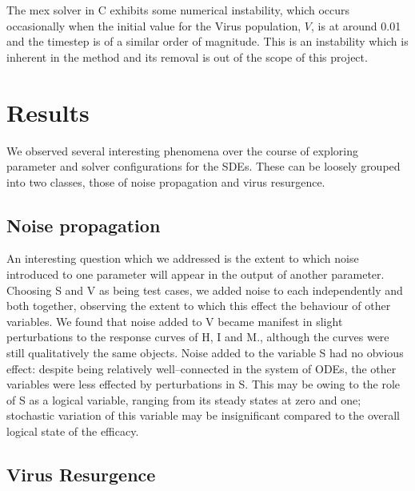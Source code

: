 \documentclass[a4paper, 12pt]{report}
\begin{document}
The mex solver in C exhibits some numerical instability, which occurs occasionally when the initial value for the Virus population, $V$, is at around 0.01 and the timestep is of a similar order of magnitude. This is an instability which is inherent in the method and its removal is out of the scope of this project.


\section{Results}

We observed several interesting phenomena over the course of exploring parameter and solver configurations for the SDEs. These can be loosely grouped into two classes, those of noise propagation and virus resurgence.

\subsection{Noise propagation}

An interesting question which we addressed is the extent to which noise introduced to one parameter will appear in the output of another parameter. Choosing S and V as being test cases, we added noise to each independently and both together, observing the extent to which this effect the behaviour of other variables. We found that noise added to V became manifest in slight perturbations to the response curves of H, I and M., although the curves were still qualitatively the same objects. Noise added to the variable S had no obvious effect: despite being relatively well--connected in the system of ODEs, the other variables were less effected by perturbations in S. This may be owing to the role of S as a logical variable, ranging from its steady states at zero and one; stochastic variation of this variable may be insignificant compared to the overall logical state of the efficacy.

\subsection{Virus Resurgence}
\end{document}
